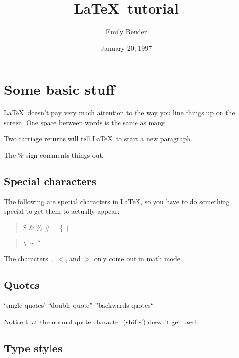 
\newcommand{\es}{\enumsentence}
\newcommand{\ees}{\eenumsentence}

\title{\LaTeX\ tutorial}
\author{Emily Bender}
\date{January 20, 1997}


\maketitle

\section{Some basic stuff}

\LaTeX\ doesn't pay very much attention to the way you line things
up on the screen.  One space between words is the same as       many.

Two carriage returns will tell \LaTeX\ to start a new paragraph.

The \% sign comments things out.  %

\subsection{Special characters}

The following are special characters in \LaTeX, so you have to
do something special to get them to actually appear:

\begin{quote}
\$ \& \% \# \_ \{ \}
\end{quote}

\begin{quote}
\begin{verbatim}
\ ~ ^
\end{verbatim}
\end{quote}

The characters $|$, $<$, and $>$ only come out in math mode.

\subsection{Quotes}

`single quotes'
``double quote''
''backwards quotes``

Notice that the normal quote character (shift-') doesn't
get used.

\subsection{Type styles}

